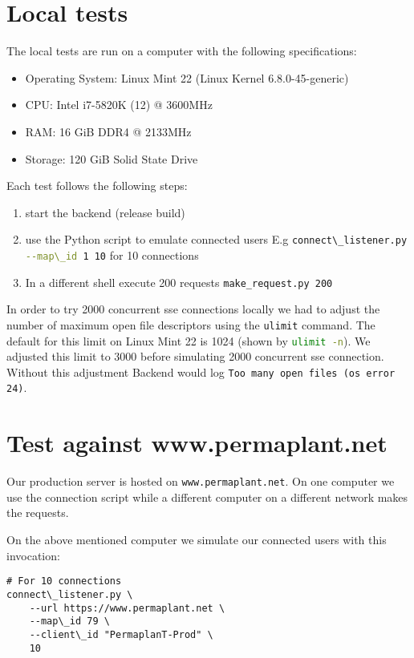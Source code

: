 \documentclass[final,oneside]{vutinfth}
\newcommand{\bashsnippet}[1]{\lstinline[language=bash]{#1}}
\newcommand{\urlsnippet}[1]{\lstinline[language=url]{#1}}
\begin{document}
\section{Local tests}

The local tests are run on a computer with the following specifications:
\begin{itemize}
  \item Operating System: Linux Mint 22 (Linux Kernel 6.8.0-45-generic)
  \item CPU: Intel i7-5820K (12) @ 3600MHz
  \item RAM: 16 GiB DDR4 @ 2133MHz
  \item Storage: 120 GiB Solid State Drive
\end{itemize}

Each test follows the following steps:
\begin{enumerate}
    \item start the backend (release build)
    \item use the Python script to emulate connected users
    E.g \bashsnippet{connect\_listener.py --map\_id 1 10} for 10 connections
    \item In a different shell execute 200 requests \texttt{make\_request.py 200}
\end{enumerate}

In order to try 2000 concurrent \gls{sse} connections locally we had to adjust the number of maximum open file descriptors using the \texttt{ulimit} command.
The default for this limit on Linux Mint 22 is 1024 (shown by \bashsnippet{ulimit -n}).
We adjusted this limit to 3000 before simulating 2000 concurrent \gls{sse} connection.
Without this adjustment Backend would log \texttt{Too many open files (os error 24)}.

\section{Test against www.permaplant.net}

Our production server is hosted on \urlsnippet{www.permaplant.net}.
On one computer we use the connection script while a different computer on a different network makes the requests.

On the above mentioned computer we simulate our connected users with this invocation: 
\begin{verbatim}
# For 10 connections
connect\_listener.py \
    --url https://www.permaplant.net \
    --map\_id 79 \
    --client\_id "PermaplanT-Prod" \
    10 
\end{verbatim}
\end{document}

